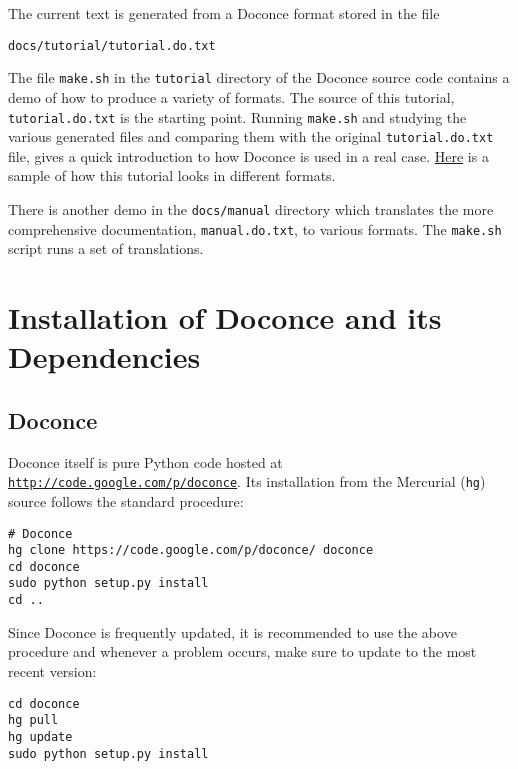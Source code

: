 \documentclass[%
oneside,                 %
final,                   %
10pt]{article}
\begin{document}
The current text is generated from a Doconce format stored in the file
\begin{Verbatim}[fontsize=\fontsize{9pt}{9pt},tabsize=8,baselinestretch=0.85,
fontfamily=tt,xleftmargin=7mm]
docs/tutorial/tutorial.do.txt
\end{Verbatim}
\noindent
The file {\fontsize{10pt}{10pt}\Verb!make.sh!} in the {\fontsize{10pt}{10pt}\Verb!tutorial!} directory of the
Doconce source code contains a demo of how to produce a variety of
formats.  The source of this tutorial, {\fontsize{10pt}{10pt}\Verb!tutorial.do.txt!} is the
starting point.  Running {\fontsize{10pt}{10pt}\Verb!make.sh!} and studying the various generated
files and comparing them with the original {\fontsize{10pt}{10pt}\Verb!tutorial.do.txt!} file,
gives a quick introduction to how Doconce is used in a real case.
\href{{https://doconce.googlecode.com/hg/doc/demos/tutorial/index.html}}{Here}
is a sample of how this tutorial looks in different formats.

There is another demo in the {\fontsize{10pt}{10pt}\Verb!docs/manual!} directory which
translates the more comprehensive documentation, {\fontsize{10pt}{10pt}\Verb!manual.do.txt!}, to
various formats. The {\fontsize{10pt}{10pt}\Verb!make.sh!} script runs a set of translations.

\section{Installation of Doconce and its Dependencies}

\subsection{Doconce}

Doconce itself is pure Python code hosted at \href{{http://code.google.com/p/doconce}}{\nolinkurl{http://code.google.com/p/doconce}}.  Its installation from the
Mercurial ({\fontsize{10pt}{10pt}\Verb!hg!}) source follows the standard procedure:
\vspace{4pt}
\begin{Verbatim}[numbers=none,frame=lines,label=\fbox{{\tiny Terminal}},fontsize=\fontsize{9pt}{9pt},
labelposition=topline,framesep=2.5mm,framerule=0.7pt]
# Doconce
hg clone https://code.google.com/p/doconce/ doconce
cd doconce
sudo python setup.py install
cd ..
\end{Verbatim}
Since Doconce is frequently updated, it is recommended to use the
above procedure and whenever a problem occurs, make sure to
update to the most recent version:
\vspace{4pt}
\begin{Verbatim}[numbers=none,frame=lines,label=\fbox{{\tiny Terminal}},fontsize=\fontsize{9pt}{9pt},
labelposition=topline,framesep=2.5mm,framerule=0.7pt]
cd doconce
hg pull
hg update
sudo python setup.py install
\end{Verbatim}
\end{document}
